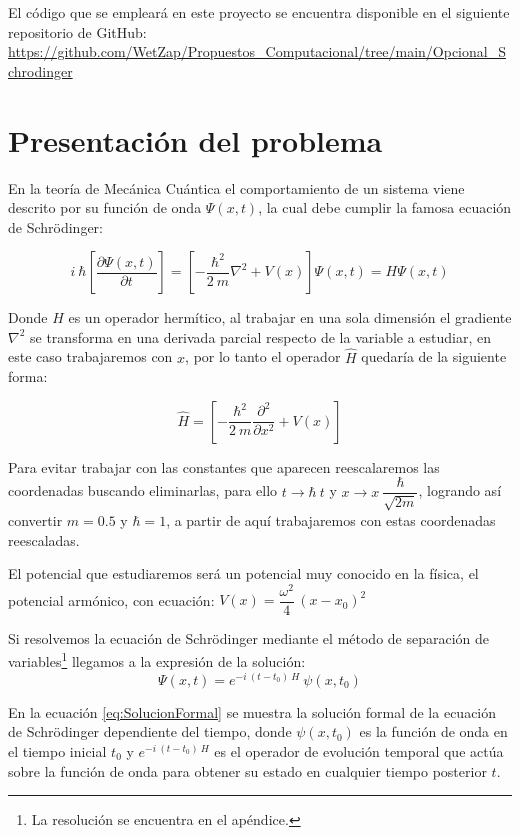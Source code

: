 \documentclass[10pt,onecolumn]{article}
\begin{document}
El código que se empleará en este proyecto se encuentra disponible en el siguiente repositorio de GitHub: \url{https://github.com/WetZap/Propuestos_Computacional/tree/main/Opcional_Schrodinger}
\section{Presentación del problema}
En la teoría de Mecánica Cuántica el comportamiento de un sistema viene descrito por su función de onda $\Psi(x,t)$, la cual debe cumplir la famosa ecuación de Schrödinger:

\begin{equation}
    i\ \hbar [\dfrac{\partial \Psi(x,t)}{\partial t}] = [-\dfrac{\hbar^2}{2\ m}\nabla^2 + V(x)]\Psi(x,t) = H \Psi(x,t)
\end{equation}

Donde $H$ es un operador hermítico, al trabajar en una sola dimensión el gradiente $\nabla^2$ se transforma en una derivada parcial respecto de la variable a estudiar, en este caso trabajaremos con $x$, por lo tanto el operador $\hat{H}$ quedaría de la siguiente forma:

\begin{equation}\label{eq:Operador_H}
\hat{H} = [-\dfrac{\hbar^2}{2\ m}\dfrac{\partial^2}{\partial x ^2} + V(x) ]   
\end{equation}

Para evitar trabajar con las constantes que aparecen reescalaremos las coordenadas buscando eliminarlas, para ello $t\rightarrow \hbar\ t$ y $x\rightarrow x\ \dfrac{\hbar}{\sqrt{2m}}$, logrando así convertir $m = 0.5$ y $\hbar = 1$, a partir de aquí trabajaremos con estas coordenadas reescaladas.


El potencial que estudiaremos será un potencial muy conocido en la física, el potencial armónico, con ecuación: $V(x)=\dfrac{\omega^{2}}{4}\,{}(x-x_{0})^{2}$

Si resolvemos la ecuación de Schrödinger mediante el método de separación de variables\footnote{La resolución se encuentra en el apéndice.} llegamos a la expresión de la solución:
\begin{equation}\label{eq:SolucionFormal}
    \Psi(x,t)= e^{-i\ (t-t_0)\  H}\ \psi(x,t_0)
\end{equation}

En la ecuación \ref{eq:SolucionFormal} se muestra la solución formal de la ecuación de Schrödinger dependiente del tiempo, donde $\psi(x,t_0)$ es la función de onda en el tiempo inicial $t_0$ y $e^{-i\ (t-t_0)\  H}$ es el operador de evolución temporal que actúa sobre la función de onda para obtener su estado en cualquier tiempo posterior $t$.
\end{document}

